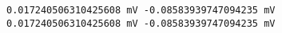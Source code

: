     \begin{Verbatim}[commandchars=\\\{\}]
0.017240506310425608 mV -0.08583939747094235 mV
0.017240506310425608 mV -0.08583939747094235 mV
    \end{Verbatim}

    \begin{center}
    \end{center}
    { \hspace*{\fill} \\}
    

    
    
    

